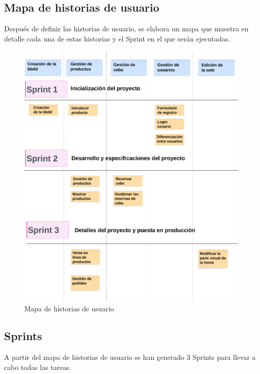 \subsection{Mapa de historias de usuario}\label{subsec4.1.2}

Después de definir las historias de usuario, se elabora un mapa que muestra en detalle cada una de estas historias y el Sprint en el que serán ejecutadas. 

\begin{figure}[H]
\begin{center}
\includegraphics[scale=0.11]{./Images/MapaHistoriasUsuario.png}
\caption{Mapa de historias de usuario}

\label{fig:fig1}

\end{center}
\end{figure}

\subsection{Sprints}\label{subsec4.1.3}

A partir del mapa de historias de usuario se han generado 3 Sprints para llevar a cabo todas las tareas.

